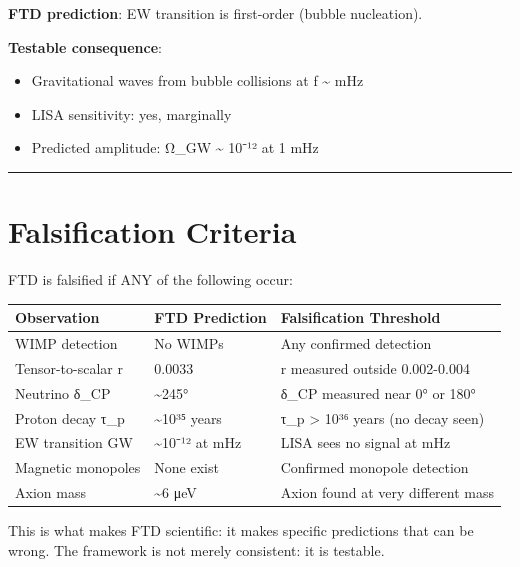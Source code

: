 \documentclass[
  11pt,
  letterpaper,
  twoside,
  openright]{book}
\providecommand{\tightlist}{%
  \setlength{\itemsep}{0pt}\setlength{\parskip}{0pt}}
\begin{document}
\textbf{FTD prediction}: EW transition is first-order (bubble
nucleation).

\textbf{Testable consequence}:

\begin{itemize}
\tightlist
\item
  Gravitational waves from bubble collisions at f \textasciitilde{} mHz
\item
  LISA sensitivity: yes, marginally
\item
  Predicted amplitude: Ω\_GW \textasciitilde{} 10⁻¹² at 1 mHz
\end{itemize}

\begin{center}\rule{0.5\linewidth}{0.5pt}\end{center}

\section{Falsification Criteria}\label{falsification-criteria-1}

FTD is falsified if ANY of the following occur:

\begin{longtable}[]{@{}lll@{}}
\toprule\noalign{}
Observation & FTD Prediction & Falsification Threshold \\
\midrule\noalign{}
\endhead
\bottomrule\noalign{}
\endlastfoot
WIMP detection & No WIMPs & Any confirmed detection \\
Tensor-to-scalar r & 0.0033 & r measured outside 0.002-0.004 \\
Neutrino δ\_CP & \textasciitilde245° & δ\_CP measured near 0° or 180° \\
Proton decay τ\_p & \textasciitilde10³⁵ years & τ\_p \textgreater{} 10³⁶
years (no decay seen) \\
EW transition GW & \textasciitilde10⁻¹² at mHz & LISA sees no signal at
mHz \\
Magnetic monopoles & None exist & Confirmed monopole detection \\
Axion mass & \textasciitilde6 μeV & Axion found at very different
mass \\
\end{longtable}

\begin{tcolorbox}[enhanced jigsaw, coltitle=black, colbacktitle=quarto-callout-important-color!10!white, toprule=.15mm, colframe=quarto-callout-important-color-frame, arc=.35mm, opacityback=0, bottomtitle=1mm, toptitle=1mm, breakable, colback=white, titlerule=0mm, opacitybacktitle=0.6, title=\textcolor{quarto-callout-important-color}{\faExclamation}\hspace{0.5em}{Scientific Status}, rightrule=.15mm, bottomrule=.15mm, leftrule=.75mm, left=2mm]

This is what makes FTD scientific: it makes specific predictions that
can be wrong. The framework is not merely consistent: it is testable.

\end{tcolorbox}
\end{document}
